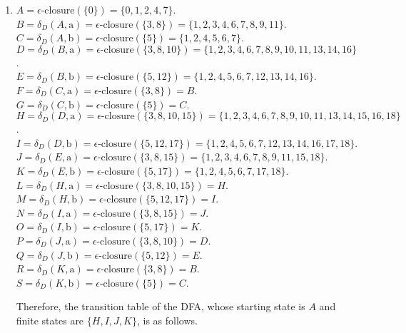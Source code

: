 \documentclass{CompilerAssignment}
\newcommand{\eclose}{\epsilon\text{-closure}}
\newcommand{\dtran}{\delta_D}
\begin{document}
\begin{enumerate}
    \item

    \(A = \eclose(\{0\}) = \{0, 1, 2, 4, 7\}\).\\ %
    \(B = \dtran(A, \text{a}) = \eclose(\{3, 8\}) = \{1, 2, 3, 4, 6, 7, 8, 9, 11\}\).\\ %
    \(C = \dtran(A, \text{b}) = \eclose(\{5\}) = \{1, 2, 4, 5, 6, 7\}\).\\ %
    \(D = \dtran(B, \text{a}) = \eclose(\{3, 8, 10\}) = \{1, 2, 3, 4, 6, 7, 8, 9, 10, 11, 13, 14, 16\}\).\\ %
    \(E = \dtran(B, \text{b}) = \eclose(\{5, 12\}) = \{1, 2, 4, 5, 6, 7, 12, 13, 14, 16\}\).\\ %
    \(F = \dtran(C, \text{a}) = \eclose(\{3, 8\}) = B\).\\
    \(G = \dtran(C, \text{b}) = \eclose(\{5\}) = C\).\\
    \(H = \dtran(D, \text{a}) = \eclose(\{3, 8, 10, 15\}) = \{1, 2, 3, 4, 6, 7, 8, 9, 10, 11, 13, 14, 15, 16, 18\}\).\\ %
    \(I = \dtran(D, \text{b}) = \eclose(\{5, 12, 17\}) = \{1, 2, 4, 5, 6, 7, 12, 13, 14, 16, 17, 18\}\).\\ %
    \(J = \dtran(E, \text{a}) = \eclose(\{3, 8, 15\}) = \{1, 2, 3, 4, 6, 7, 8, 9, 11, 15, 18\}\).\\ %
    \(K = \dtran(E, \text{b}) = \eclose(\{5, 17\}) = \{1, 2, 4, 5, 6, 7, 17, 18\}\).\\ %
    \(L = \dtran(H, \text{a}) = \eclose(\{3, 8, 10, 15\}) = H\).\\
    \(M = \dtran(H, \text{b}) = \eclose(\{5, 12, 17\}) = I\).\\
    \(N = \dtran(I, \text{a}) = \eclose(\{3, 8, 15\}) = J\).\\
    \(O = \dtran(I, \text{b}) = \eclose(\{5, 17\}) = K\).\\
    \(P = \dtran(J, \text{a}) = \eclose(\{3, 8, 10\}) = D\).\\
    \(Q = \dtran(J, \text{b}) = \eclose(\{5, 12\}) = E\).\\
    \(R = \dtran(K, \text{a}) = \eclose(\{3, 8\}) = B\).\\
    \(S = \dtran(K, \text{b}) = \eclose(\{5\}) = C\).

    \newpage

    Therefore, the transition table of the DFA, whose starting state is $A$ and finite states are \(\{H, I, J, K\}\), is as follows.
    

\end{enumerate}
\end{document}
